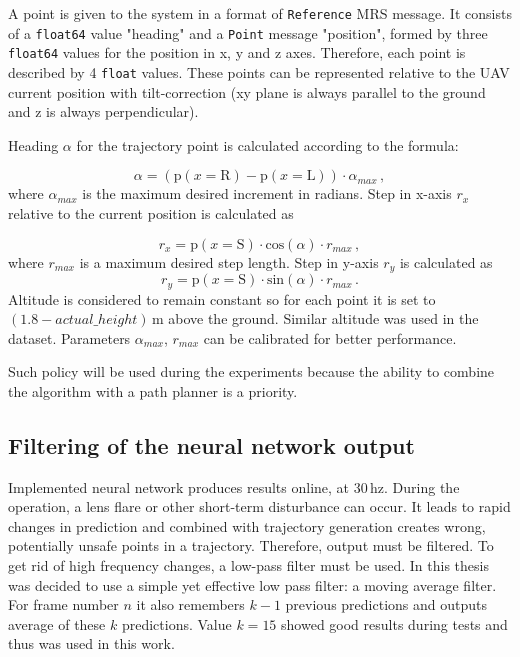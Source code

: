 A point is given to the system in a format of \texttt{Reference} \acs{MRS} message. It consists of a \texttt{float64} value "heading" and a \texttt{Point} message "position", formed by three \texttt{float64} values for the position in x, y and z axes. Therefore, each point is described by 4 \texttt{float} values. These points can be represented relative to the \acs{UAV} current position with tilt-correction (xy plane is always parallel to the ground and z is always perpendicular). 

Heading $\alpha$ for the trajectory point is calculated according to the formula:

\begin{equation}
	\alpha = (\textrm{p}(x = \textrm{R}) - \textrm{p}(x = \textrm{L}))\cdot \alpha_{max}\,,
\end{equation}
where $\alpha_{max}$ is the maximum desired increment in radians. Step in x-axis $r_x$ relative to the current position is calculated as

\begin{equation}
	r_x = \textrm{p}(x = \textrm{S})\cdot \textrm{cos}(\alpha)\cdot r_{max}\,,
\end{equation}
where $r_{max}$ is a maximum desired step length. Step in y-axis $r_y$ is calculated as
\begin{equation}
	r_y = \textrm{p}(x = \textrm{S})\cdot \textrm{sin}(\alpha)\cdot r_{max}\,.
\end{equation}
Altitude is considered to remain constant so for each point it is set to $(1.8 - actual\_height)$\,m above the ground. Similar altitude was used in the dataset. Parameters $\alpha_{max}$, $r_{max}$ can be calibrated for better performance.

Such policy will be used during the experiments because the ability to combine the algorithm with a path planner is a priority.

\subsection{Filtering of the neural network output}

Implemented neural network produces results online, at 30\,hz. During the operation, a lens flare or other short-term disturbance can occur. It leads to rapid changes in prediction and combined with trajectory generation creates wrong, potentially unsafe points in a trajectory. Therefore, output must be filtered. To get rid of high frequency changes, a low-pass filter must be used. In this thesis was decided to use a simple yet effective low pass filter: a moving average filter. For frame number $n$ it also remembers $k-1$ previous predictions and outputs average of these $k$ predictions. Value $k=15$ showed good results during tests and thus was used in this work.


